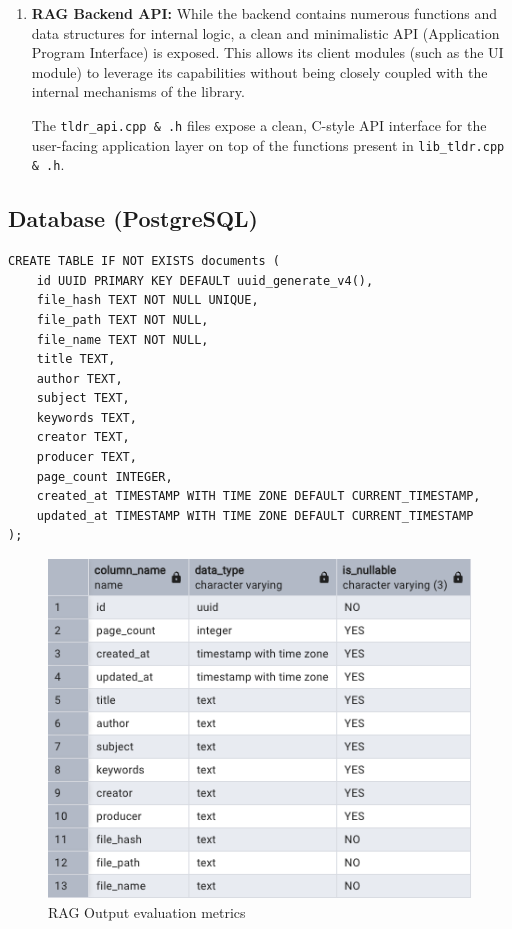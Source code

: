 \begin{enumerate}[label=\Alph*.]
\item{\textbf{RAG Backend API:}}
While the backend contains numerous functions and data structures for internal logic, a clean and minimalistic API (Application Program Interface) is exposed. This allows its client modules (such as the UI module) to leverage its capabilities without being closely coupled with the internal mechanisms of the library.

The \texttt{tldr\_api.cpp \& .h} files expose a clean, C-style API interface for the user-facing application layer on top of the functions present in \texttt{lib\_tldr.cpp \& .h}. 

\end{enumerate}

\subsection{Database (PostgreSQL)}
\label{subsec:AppDesignModules-DatabasePSQL}
\begin{lstlisting}
CREATE TABLE IF NOT EXISTS documents (
    id UUID PRIMARY KEY DEFAULT uuid_generate_v4(),
    file_hash TEXT NOT NULL UNIQUE,
    file_path TEXT NOT NULL,
    file_name TEXT NOT NULL,
    title TEXT,
    author TEXT,
    subject TEXT,
    keywords TEXT,
    creator TEXT,
    producer TEXT,
    page_count INTEGER,
    created_at TIMESTAMP WITH TIME ZONE DEFAULT CURRENT_TIMESTAMP,
    updated_at TIMESTAMP WITH TIME ZONE DEFAULT CURRENT_TIMESTAMP
);
\end{lstlisting}
\begin{figure}[H]
    \centering
    \includegraphics[width=1.0\linewidth]{images/dbtable-documents.png}
    \caption{RAG Output evaluation metrics ~\cite{cardenas2023rag}}
    \label{fig:autoregressive_decoding}
\end{figure}


